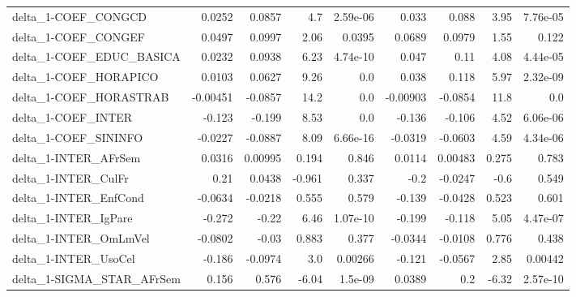 \begin{tabular}{lrrrrrrrr}
delta\_1-COEF\_CONGCD                   &      0.0252 &       0.0857 &     4.7 & 2.59e-06 &      0.033 &       0.088 &         3.95 &      7.76e-05 \\
delta\_1-COEF\_CONGEF                   &      0.0497 &       0.0997 &    2.06 &   0.0395 &     0.0689 &      0.0979 &         1.55 &         0.122 \\
delta\_1-COEF\_EDUC\_BASICA              &      0.0232 &       0.0938 &    6.23 & 4.74e-10 &      0.047 &        0.11 &         4.08 &      4.44e-05 \\
delta\_1-COEF\_HORAPICO                 &      0.0103 &       0.0627 &    9.26 &      0.0 &      0.038 &       0.118 &         5.97 &      2.32e-09 \\
delta\_1-COEF\_HORASTRAB                &    -0.00451 &      -0.0857 &    14.2 &      0.0 &   -0.00903 &     -0.0854 &         11.8 &           0.0 \\
delta\_1-COEF\_INTER                    &      -0.123 &       -0.199 &    8.53 &      0.0 &     -0.136 &      -0.106 &         4.52 &      6.06e-06 \\
delta\_1-COEF\_SININFO                  &     -0.0227 &      -0.0887 &    8.09 & 6.66e-16 &    -0.0319 &     -0.0603 &         4.59 &      4.34e-06 \\
delta\_1-INTER\_AFrSem                  &      0.0316 &      0.00995 &   0.194 &    0.846 &     0.0114 &     0.00483 &        0.275 &         0.783 \\
delta\_1-INTER\_CulFr                   &        0.21 &       0.0438 &  -0.961 &    0.337 &       -0.2 &     -0.0247 &         -0.6 &         0.549 \\
delta\_1-INTER\_EnfCond                 &     -0.0634 &      -0.0218 &   0.555 &    0.579 &     -0.139 &     -0.0428 &        0.523 &         0.601 \\
delta\_1-INTER\_IgPare                  &      -0.272 &        -0.22 &    6.46 & 1.07e-10 &     -0.199 &      -0.118 &         5.05 &      4.47e-07 \\
delta\_1-INTER\_OmLmVel                 &     -0.0802 &        -0.03 &   0.883 &    0.377 &    -0.0344 &     -0.0108 &        0.776 &         0.438 \\
delta\_1-INTER\_UsoCel                  &      -0.186 &      -0.0974 &     3.0 &  0.00266 &     -0.121 &     -0.0567 &         2.85 &       0.00442 \\
delta\_1-SIGMA\_STAR\_AFrSem             &       0.156 &        0.576 &   -6.04 &  1.5e-09 &     0.0389 &         0.2 &        -6.32 &      2.57e-10 \\

\end{tabular}
